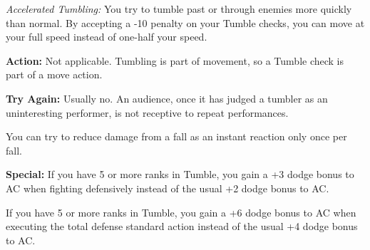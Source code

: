 \textit{Accelerated Tumbling:} You try to tumble past or through enemies more quickly than normal. By accepting a -10 penalty on your Tumble checks, you can move at your full speed instead of one-half your speed.

\textbf{Action:} Not applicable. Tumbling is part of movement, so a Tumble check is part of a move action.

\textbf{Try Again:} Usually no. An audience, once it has judged a tumbler as an uninteresting performer, is not receptive to repeat performances.

You can try to reduce damage from a fall as an instant reaction only once per fall.

\textbf{Special:} If you have 5 or more ranks in Tumble, you gain a +3 dodge bonus to AC when fighting defensively instead of the usual +2 dodge bonus to AC.

If you have 5 or more ranks in Tumble, you gain a +6 dodge bonus to AC when executing the total defense standard action instead of the usual +4 dodge bonus to AC.
